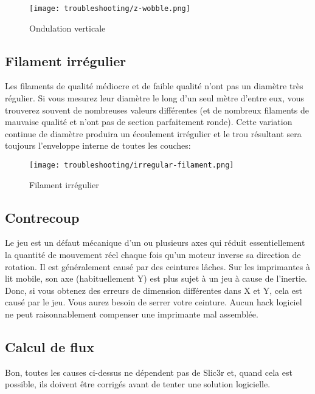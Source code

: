 \begin{figure}[H]
\centering
\texttt{[image: troubleshooting/z-wobble.png]}
\caption{Ondulation verticale}
\label{fig:z_wobble}
\end{figure}

\subsection{Filament irrégulier}

Les filaments de qualité médiocre et de faible qualité n'ont pas un diamètre très régulier. Si vous mesurez leur diamètre le long d'un seul mètre d'entre eux, vous trouverez souvent de nombreuses valeurs différentes (et de nombreux filaments de mauvaise qualité et n'ont pas de section parfaitement ronde). Cette variation continue de diamètre produira un écoulement irrégulier et le trou résultant sera toujours l'enveloppe interne de toutes les couches:

\begin{figure}[H]
\centering
\texttt{[image: troubleshooting/irregular-filament.png]}
\caption{Filament irrégulier}
\label{fig:irregular_filament}
\end{figure}

\subsection{Contrecoup}

Le jeu est un défaut mécanique d'un ou plusieurs axes qui réduit essentiellement la quantité de mouvement réel chaque fois qu'un moteur inverse sa direction de rotation. Il est généralement causé par des ceintures lâches. Sur les imprimantes à lit mobile, son axe (habituellement Y) est plus sujet à un jeu à cause de l'inertie. Donc, si vous obtenez des erreurs de dimension différentes dans X et Y, cela est causé par le jeu. Vous aurez besoin de serrer votre ceinture. Aucun hack logiciel ne peut raisonnablement compenser une imprimante mal assemblée.

\subsection{Calcul de flux}

Bon, toutes les causes ci-dessus ne dépendent pas de Slic3r et, quand cela est possible, ils doivent être corrigés avant de tenter une solution logicielle.

